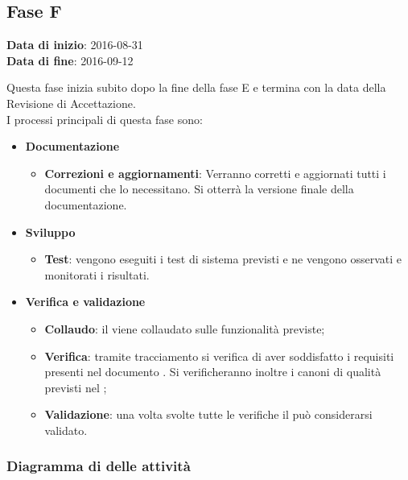 	\subsection{Fase F}
	\begin{center}
		\textbf{Data di inizio}: 2016-08-31 \\
		\textbf{Data di fine}: 2016-09-12 \\
	\end{center}
	Questa fase inizia subito dopo la fine della fase E e termina con la data della Revisione di Accettazione. \\
	I processi principali di questa fase sono:
		\begin{itemize}
			\item \textbf{Documentazione}
			\att
			\begin{itemize}
				\item \textbf{Correzioni e aggiornamenti}: Verranno corretti e aggiornati tutti i documenti che lo necessitano. Si otterrà la versione finale della documentazione. 
			\end{itemize}
			\item \textbf{Sviluppo}
			\att
				\begin{itemize}
					\item \textbf{Test}: vengono eseguiti i test di sistema previsti e ne vengono osservati e monitorati i risultati. 
				\end{itemize}
			\item \textbf{Verifica e validazione}
			\att
			\begin{itemize}
				\item \textbf{Collaudo}: il  viene collaudato sulle funzionalità previste;
				\item \textbf{Verifica}: tramite tracciamento si verifica di aver soddisfatto i requisiti presenti nel documento \ARdocRA. Si verificheranno inoltre i canoni di qualità previsti nel \PQdocRA;
				\item \textbf{Validazione}: una volta svolte tutte le verifiche il  può considerarsi validato.
			\end{itemize}
		\end{itemize}
		\subsubsection{Diagramma di  delle attività}
		
